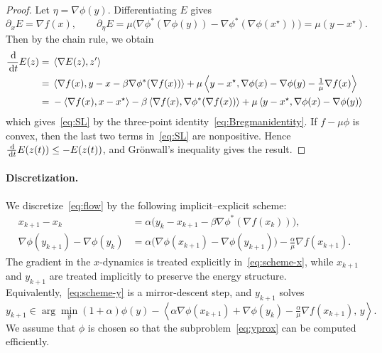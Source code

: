 \documentclass{article}
\newcommand{\dd}{\,{\rm d}}
\newcommand{\dual}[1]{\left\langle {#1} \right\rangle}
\theoremstyle{plain}
\theoremstyle{definition}
\theoremstyle{remark}
\begin{document}
\begin{proof}
Let $\eta=\nabla\phi(y)$. Differentiating $E$ gives
$$
\partial_x E=\nabla f(x),
\qquad
\partial_\eta E
=\mu\bigl(\nabla\phi^*(\nabla\phi(y))-\nabla\phi^*(\nabla\phi(x^\star))\bigr)
=\mu(y-x^\star).
$$
Then by the chain rule, we obtain
$$
\begin{aligned}
\frac{\dd}{\dd t}E(z)
={}&\dual{\nabla E(z),z'}\\
={}&\dual{\nabla f(x),y-x-\beta\nabla\phi^*(\nabla f(x))}
+\mu\dual{y-x^\star,\nabla\phi(x)-\nabla\phi(y)-\tfrac1\mu\nabla f(x)}\\
={}&-\dual{\nabla f(x),x-x^\star}
-\beta\dual{\nabla f(x),\nabla\phi^*(\nabla f(x))}
+ \mu\dual{y-x^\star,\nabla\phi(x)-\nabla\phi(y)}
\end{aligned}
$$
which gives~\eqref{eq:SL} by the three-point identity~\eqref{eq:Bregmanidentity}. If $f-\mu\phi$ is convex, then the last two terms in~\eqref{eq:SL} are nonpositive. Hence $\frac{\dd}{\dd t}E(z(t))\le -E(z(t))$, and Gr\"onwall's inequality gives the result.
\end{proof}

\paragraph{Discretization.}
We discretize~\eqref{eq:flow} by the following implicit--explicit scheme:
\begin{subequations}\label{eq:scheme}
\begin{align}
x_{k+1}-x_k
&= \alpha\bigl(y_k-x_{k+1}-\beta\nabla\phi^*(\nabla f(x_k))\bigr),
\label{eq:scheme-x}\\
\nabla\phi(y_{k+1})-\nabla\phi(y_k)
&= \alpha\bigl(\nabla\phi(x_{k+1})-\nabla\phi(y_{k+1})\bigr)
-\tfrac{\alpha}{\mu}\nabla f(x_{k+1}).
\label{eq:scheme-y}
\end{align}
\end{subequations}
The gradient in the $x$-dynamics is treated explicitly in~\eqref{eq:scheme-x}, while $x_{k+1}$ and $y_{k+1}$ are treated implicitly to preserve the energy structure. Equivalently,~\eqref{eq:scheme-y} is a mirror-descent step, and $y_{k+1}$ solves
\begin{equation}\label{eq:yprox}
y_{k+1}\in\arg\min_y (1+\alpha)\phi(y)
-
\left\langle
\alpha\nabla\phi(x_{k+1})+\nabla\phi(y_k)-\tfrac{\alpha}{\mu}\nabla f(x_{k+1}),\,y
\right\rangle.
\end{equation}
We assume that $\phi$ is chosen so that the subproblem~\eqref{eq:yprox} can be computed efficiently.
\end{document}
